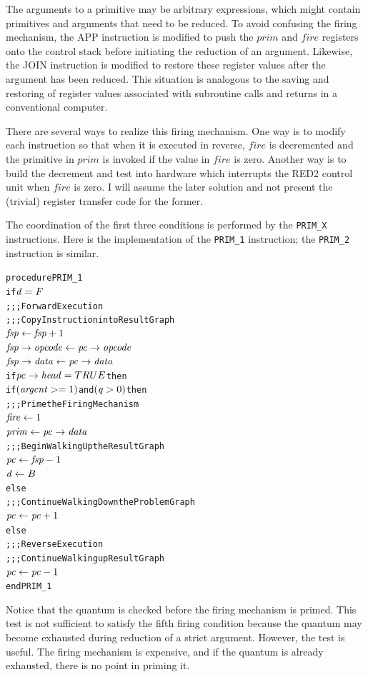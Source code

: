 The arguments to a primitive may be arbitrary expressions, which might contain primitives
and arguments that need to be reduced. To avoid confusing the firing mechanism, the APP
instruction is modified to push the \(prim\) and \(fire\) registers onto the control stack
before initiating the reduction of an argument. Likewise, the JOIN instruction is modified
to restore these register values after the argument has been reduced. This situation is
analogous to the saving and restoring of register values associated with subroutine calls
and returns in a conventional computer.

There are several ways to realize this firing mechanism. One way is to modify each
instruction so that when it is executed in reverse, \(fire\) is decremented and the
primitive in \(prim\) is invoked if the value in \(fire\) is zero. Another way is to build
the decrement and test into hardware which interrupts the RED2 control unit when \(fire\)
is zero. I will assume the later solution and not present the (trivial) register transfer
code for the former.


The coordination of the first three conditions is performed by the \texttt{PRIM\_X}
instructions. Here is the implementation of the \texttt{PRIM\_1} instruction; the \texttt{PRIM\_2}
instruction is similar.

\begin{alltt}
procedure PRIM\_1
  if \(\rt{d} = F\)
    ;;; Forward Execution
    ;;; Copy Instruction into Result Graph
    \(\rt{fsp} \leftarrow \rt{fsp}+1\)
    \(\rtfield{fsp}{opcode} \leftarrow \rtfield{pc}{opcode}\)
    \(\rtfield{fsp}{data} \leftarrow \rtfield{pc}{data}\)
    if \(\rtfield{pc}{head} = TRUE\) then
      if \((\rt{argcnt} >= 1)\) and \((\rt{q} > 0)\) then
        ;;; Prime the Firing Mechanism
        \(\rt{fire} \leftarrow 1\)
        \(\rt{prim} \leftarrow \rtfield{pc}{data}\)
      ;;; Begin Walking Up the Result Graph
      \(\rt{pc} \leftarrow \rt{fsp}-1\)
      \(\rt{d} \leftarrow B\)
    else
      ;;; Continue Walking Down the Problem Graph
      \(\rt{pc} \leftarrow \rt{pc}+1\)
  else
    ;;; Reverse Execution
    ;;; Continue Walking up Result Graph
    \(\rt{pc} \leftarrow \rt{pc}-1\)
end PRIM\_1
\end{alltt}

Notice that the quantum is checked before the firing mechanism is primed. This test is
not sufficient to satisfy the fifth firing condition because the quantum may become
exhausted during reduction of a strict argument. However, the test is useful. The firing
mechanism is expensive, and if the quantum is already exhausted, there is no point in
priming it.

